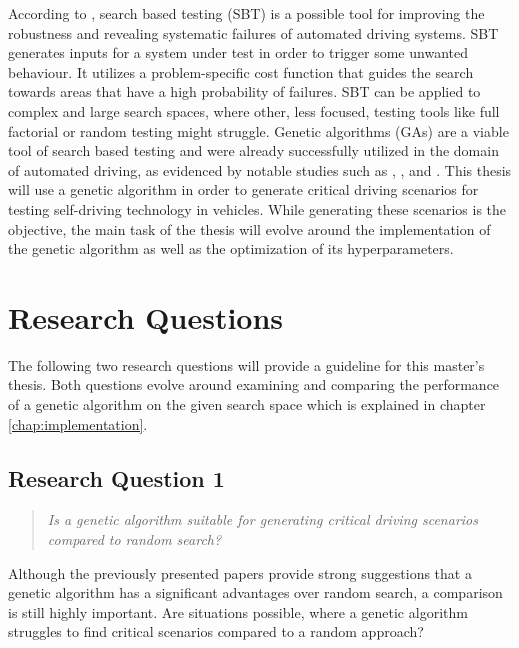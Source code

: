 According to \cite{kluck_search-based_2022}, search based testing (SBT) is a possible tool for improving the robustness and revealing systematic failures of automated driving systems. SBT generates inputs for a system under test in order to trigger some unwanted behaviour. It utilizes a problem-specific cost function that guides the search towards areas that have a high probability of failures. SBT can be applied to complex and large search spaces, where other, less focused, testing tools like full factorial or random testing might struggle. Genetic algorithms (GAs) are a viable tool of search based testing and were already successfully utilized in the domain of automated driving, as evidenced by notable studies such as \cite{klampfl_using_nodate}, \cite{felbinger_comparing_2019}, \cite{kaufmann_critical_2021} and \cite{almanee_scenorita_2021}. This thesis will use a genetic algorithm in order to generate critical driving scenarios for testing self-driving technology in vehicles. While generating these scenarios is the objective, the main task of the thesis will evolve around the implementation of the genetic algorithm as well as the optimization of its hyperparameters.

\section{Research Questions}
The following two research questions will provide a guideline for this master's thesis. Both questions evolve around examining and comparing the performance of a genetic algorithm on the given search space which is explained in chapter \ref{chap:implementation}.

\subsection{Research Question 1}
\begin{quote}
	\begin{em}
		\textit{Is a genetic algorithm suitable for generating critical driving scenarios compared to random search?}
	\end{em}
\end{quote}

Although the previously presented papers provide strong suggestions that a genetic algorithm has a significant advantages over random search, a comparison is still highly important. Are situations possible, where a genetic algorithm struggles to find critical scenarios compared to a random approach?

